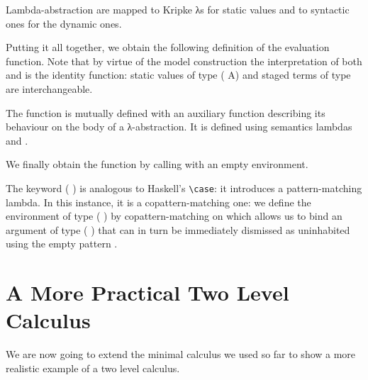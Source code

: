 
Lambda-abstraction are mapped to Kripke λs for static values
and to syntactic ones for the dynamic ones.


Putting it all together, we obtain the following definition
of the evaluation function.
Note that by virtue of the model construction the interpretation
of both  and  is the identity function:
static values of type ( A) and staged terms of type 
are interchangeable.

\begin{AgdaSuppressSpace}
\end{AgdaSuppressSpace}

The function  is mutually defined with an auxiliary
function describing its behaviour on the body of a λ-abstraction.
It is defined using semantics lambdas and .

\begin{AgdaSuppressSpace}
\end{AgdaSuppressSpace}

We finally obtain the  function by calling  with an
empty environment.

\begin{AgdaSuppressSpace}
\end{AgdaSuppressSpace}

\begin{remark}
The keyword ( ) is analogous to Haskell's
\texttt{\textbackslash{}case}: it introduces a pattern-matching lambda.
In this instance, it is a copattern-matching one: we define
the environment of type (  ) by
copattern-matching on {} which allows us to bind
an argument of type (  ) that can in turn
be immediately dismissed as uninhabited using the empty pattern \AS{()}.
\end{remark}

\section{A More Practical Two Level Calculus}

We are now going to extend the minimal calculus we used so far to
show a more realistic example of a two level calculus.

